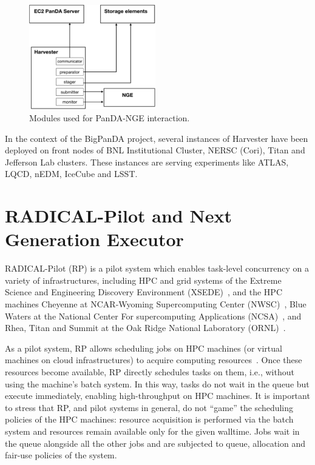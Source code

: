 \documentclass{webofc}
\begin{document}
\begin{figure}
  \centering
  \includegraphics[width=0.49\textwidth]{figures/panda-harvester-modules.pdf}
  \caption{Modules used for PanDA-NGE interaction.}
  \label{fig:harvester-modules}
\end{figure}

In the context of the BigPanDA project, several instances of Harvester have
been deployed on front nodes of BNL Institutional Cluster, NERSC (Cori),
Titan and Jefferson Lab clusters. These instances are serving experiments
like ATLAS, LQCD, nEDM, IceCube and LSST.


\section{RADICAL-Pilot and Next Generation Executor}\label{sec:rp}

RADICAL-Pilot (RP) is a pilot system which enables task-level concurrency on
a variety of infrastructures, including HPC and grid systems of the Extreme
Science and Engineering Discovery Environment (XSEDE)~\cite{towns2014xsede},
and the HPC machines Cheyenne at NCAR-Wyoming Supercomputing Center
(NWSC)~\cite{cheyenne}, Blue Waters at the National Center For supercomputing
Applications (NCSA)~\cite{bluewaters}, and Rhea, Titan and Summit at the Oak
Ridge National Laboratory (ORNL)~\cite{olcf-resources}.

As a pilot system, RP allows scheduling jobs on HPC machines (or virtual
machines on cloud infrastructures) to acquire computing
resources~\cite{turilli2018comprehensive}. Once these resources become
available, RP directly schedules tasks on them, i.e., without using the
machine’s batch system. In this way, tasks do not wait in the queue but
execute immediately, enabling high-throughput on HPC machines. It is
important to stress that RP, and pilot systems in general, do not ``game''
the scheduling policies of the HPC machines: resource acquisition is
performed via the batch system and resources remain available only for the
given walltime. Jobs wait in the queue alongside all the other jobs and are
subjected to queue, allocation and fair-use policies of the system.
	
\end{document}
